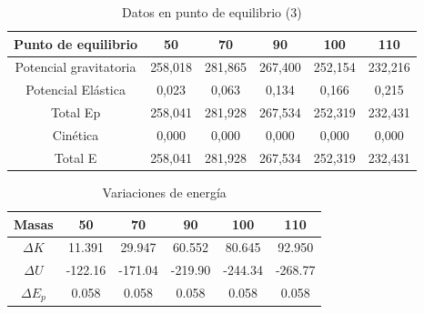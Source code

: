 \documentclass[a4paper]{article}
\begin{document}
\begin{table}[H]
    \centering
    \begin{tabular}{|c|c|c|c|c|c|}
    \hline
        Punto de equilibrio & 50 & 70 & 90 & 100 & 110  \\ \hline
        Potencial gravitatoria & 258,018 & 281,865 & 267,400 & 252,154 & 232,216  \\ \hline
        Potencial Elástica & 0,023 & 0,063 & 0,134 & 0,166 & 0,215  \\ \hline
        Total Ep & 258,041 & 281,928 & 267,534 & 252,319 & 232,431  \\ \hline
        Cinética & 0,000 & 0,000 & 0,000 & 0,000 & 0,000  \\ \hline
        Total E & 258,041 & 281,928 & 267,534 & 252,319 & 232,431  \\ \hline
    \end{tabular}
    \caption{Datos en punto de equilibrio (3)}
    \label{Datos en punto de equilibrio}
\end{table}

\begin{table}[H]
    \centering
    \begin{tabular}{|c|c|c|c|c|c|}
    \hline
        Masas & 50 & 70 & 90 & 100 & 110  \\ \hline
        $\Delta K$ & 11.391 & 29.947 & 60.552 & 80.645 & 92.950  \\ \hline
        $\Delta U$ & -122.16 & -171.04 & -219.90 & -244.34 & -268.77  \\ \hline
        $\Delta E_p$ & 0.058 & 0.058 & 0.058 & 0.058 & 0.058  \\ \hline
        
    \end{tabular}
    \caption{Variaciones de energía}
    \label{Variaciones de energía}
\end{table}
\end{document}

